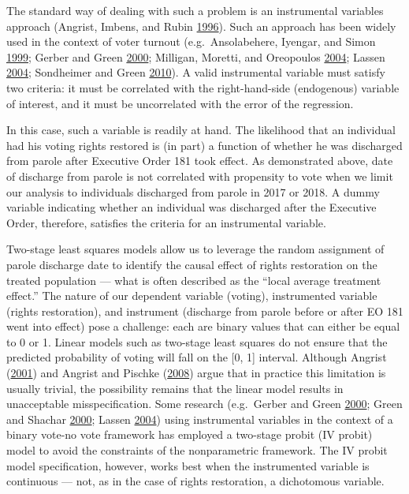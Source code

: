 \documentclass[]{article}
\begin{document}
The standard way of dealing with such a problem is an instrumental variables approach (Angrist, Imbens, and Rubin \protect\hyperlink{ref-Angrist1996}{1996}). Such an approach has been widely used in the context of voter turnout (e.g.~Ansolabehere, Iyengar, and Simon \protect\hyperlink{ref-Ansolabehere1999}{1999}; Gerber and Green \protect\hyperlink{ref-Gerber2000}{2000}; Milligan, Moretti, and Oreopoulos \protect\hyperlink{ref-Milligan2004}{2004}; Lassen \protect\hyperlink{ref-Lassen2004}{2004}; Sondheimer and Green \protect\hyperlink{ref-Sondheimer2010}{2010}). A valid instrumental variable must satisfy two criteria: it must be correlated with the right-hand-side (endogenous) variable of interest, and it must be uncorrelated with the error of the regression.

In this case, such a variable is readily at hand. The likelihood that an individual had his voting rights restored is (in part) a function of whether he was discharged from parole after Executive Order 181 took effect. As demonstrated above, date of discharge from parole is not correlated with propensity to vote when we limit our analysis to individuals discharged from parole in 2017 or 2018. A dummy variable indicating whether an individual was discharged after the Executive Order, therefore, satisfies the criteria for an instrumental variable.

Two-stage least squares models allow us to leverage the random assignment of parole discharge date to identify the causal effect of rights restoration on the treated population --- what is often described as the ``local average treatment effect.'' The nature of our dependent variable (voting), instrumented variable (rights restoration), and instrument (discharge from parole before or after EO 181 went into effect) pose a challenge: each are binary values that can either be equal to 0 or 1. Linear models such as two-stage least squares do not ensure that the predicted probability of voting will fall on the {[}0, 1{]} interval. Although Angrist (\protect\hyperlink{ref-Angrist2001}{2001}) and Angrist and Pischke (\protect\hyperlink{ref-Angrist2008}{2008}) argue that in practice this limitation is usually trivial, the possibility remains that the linear model results in unacceptable misspecification. Some research (e.g.~Gerber and Green \protect\hyperlink{ref-Gerber2000}{2000}; Green and Shachar \protect\hyperlink{ref-Green2000}{2000}; Lassen \protect\hyperlink{ref-Lassen2004}{2004}) using instrumental variables in the context of a binary vote-no vote framework has employed a two-stage probit (IV probit) model to avoid the constraints of the nonparametric framework. The IV probit model specification, however, works best when the instrumented variable is continuous --- not, as in the case of rights restoration, a dichotomous variable.
\end{document}
